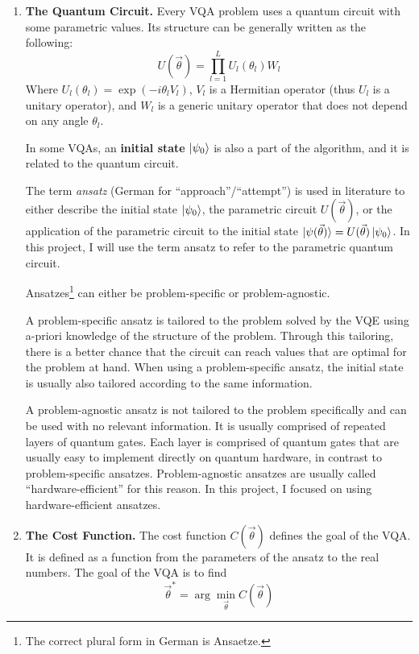 \documentclass[a4paper,12pt]{article}
\newcommand{\thetas}{\vec{\theta}}
\begin{document}
\begin{enumerate}
    \item \textbf{The Quantum Circuit.} Every VQA problem uses a quantum circuit with some parametric values.
    Its structure can be generally written as the following:
    \begin{equation}
        U(\thetas) = \prod_{l=1}^{L} U_l(\theta_l) W_l
    \end{equation}
    Where $U_l(\theta_l) = \exp(-i\theta_l V_l)$, $V_l$ is a Hermitian operator (thus $U_l$ is a unitary operator), and $W_l$ is a generic unitary operator that does not depend on any angle $\theta_l$.
    
    In some VQAs, an \textbf{initial state} $\ket{\psi_0}$ is also a part of the algorithm, and it is related to the quantum circuit.

    The term \emph{ansatz} (German for ``approach''/``attempt'') is used in literature to either describe the initial state $\ket{\psi_0}$, the parametric circuit $U(\thetas)$, or the application of the parametric circuit to the initial state $\ket{\psi(\thetas)} = U(\thetas)\ket{\psi_0}$.
    In this project, I will use the term ansatz to refer to the parametric quantum circuit.

    Ansatzes\footnote{The correct plural form in German is Ansaetze.} can either be problem-specific or problem-agnostic.

    A problem-specific ansatz is tailored to the problem solved by the VQE using a-priori knowledge of the structure of the problem. Through this tailoring, there is a better chance that the circuit can reach values that are optimal for the problem at hand. When using a problem-specific ansatz, the initial state is usually also tailored according to the same information.
    
    A problem-agnostic ansatz is not tailored to the problem specifically and can be used with no relevant information. It is usually comprised of repeated layers of quantum gates. Each layer is comprised of quantum gates that are usually easy to implement directly on quantum hardware, in contrast to problem-specific ansatzes. Problem-agnostic ansatzes are usually called ``hardware-efficient'' for this reason.
    In this project, I focused on using hardware-efficient ansatzes.
    
    \item \textbf{The Cost Function.} The cost function $C(\thetas)$ defines the goal of the VQA. It is defined as a function from the parameters of the ansatz to the real numbers.
    The goal of the VQA is to find
    \begin{equation}
        \thetas^* = \arg\min_{\thetas} C(\thetas)
    \end{equation}


\end{enumerate}
\end{document}
